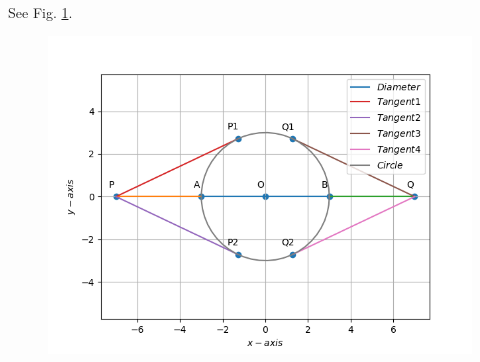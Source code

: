 \\
\solution See Fig. 
		\ref{fig:10/11/2/3}.
	\begin{figure}[!ht]
		\centering
 \includegraphics[width=\columnwidth]{chapters/10/11/2/3/figs/Question.png}
		\caption{}
		\label{fig:10/11/2/3}
  	\end{figure}
